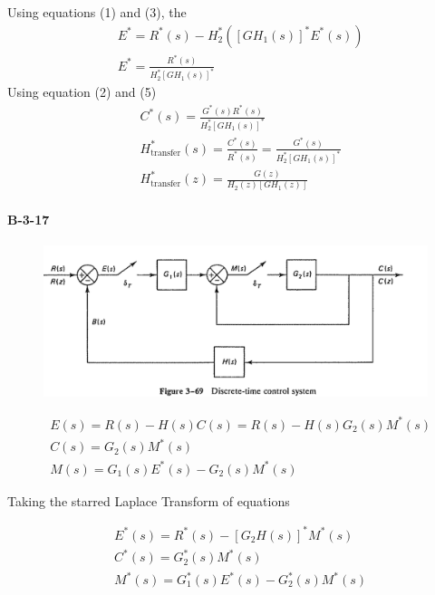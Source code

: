 {Using equations (1) and (3), the
\begin{align} 
& E^\ast = R^\ast(s)-H_2^\ast ([GH_1(s)]^\ast  E^\ast(s)) \\
& E^\ast = \frac{R^\ast(s)}{H_2^\ast [GH_1(s)]^\ast }
\end{align}
Using equation (2) and (5)
\begin{align*}
& C^\ast(s) =  \frac{G^\ast(s)R^\ast(s)}{H_2^\ast [GH_1(s)]^\ast }\\
& H_{\text{transfer}}^\ast(s)=\frac{C^\ast(s)}{R^\ast(s)} = \frac{G^\ast(s)}{H_2^\ast [GH_1(s)]^\ast } \\
& H_{\text{transfer}}^\ast(z)= \frac{G(z)}{H_2(z) [GH_1(z)]}
\end{align*}
\paragraph{B-3-17}

\begin{figure}[H]
	\centering
	\includegraphics [width=0.85\linewidth]{OgataB-3-17.png}
\end{figure}

\begin{align*}
& E (s) = R(s)- H(s)C(s) = R(s) - H(s)G_2(s)M^\ast(s) \\
& C(s)= G_2(s)M^\ast(s)  \\
& M(s)=G_1(s) E^\ast(s) - G_2(s)M^\ast(s)
\end{align*}

Taking the starred Laplace Transform of equations 

\begin{align}
& E^\ast(s)=R^\ast(s)-[G_2H(s)]^\ast M^\ast(s) \\
& C^\ast(s) = G_2^\ast(s)M^\ast(s) \\
& M^\ast(s)=G_1^\ast(s) E^\ast(s) -G_2^\ast (s) M^\ast(s)
\end{align}

}
